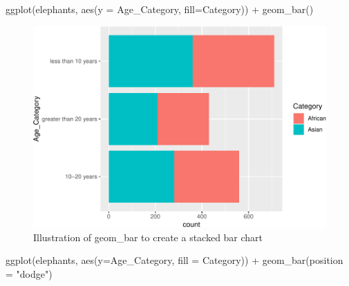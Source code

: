 \documentclass[
]{book}
\newenvironment{Shaded}{\begin{snugshade}}{\end{snugshade}}
\newcommand{\AttributeTok}[1]{\textcolor[rgb]{0.77,0.63,0.00}{#1}}
\newcommand{\FunctionTok}[1]{\textcolor[rgb]{0.00,0.00,0.00}{#1}}
\newcommand{\NormalTok}[1]{#1}
\newcommand{\SpecialCharTok}[1]{\textcolor[rgb]{0.00,0.00,0.00}{#1}}
\newcommand{\StringTok}[1]{\textcolor[rgb]{0.31,0.60,0.02}{#1}}
\begin{document}
\begin{Shaded}
\begin{Highlighting}[]
\FunctionTok{ggplot}\NormalTok{(elephants, }\FunctionTok{aes}\NormalTok{(}\AttributeTok{y =}\NormalTok{ Age\_Category, }\AttributeTok{fill=}\NormalTok{Category)) }\SpecialCharTok{+} 
  \FunctionTok{geom\_bar}\NormalTok{()}
\end{Highlighting}
\end{Shaded}

\begin{figure}
\centering
\includegraphics{Data-Visualisation-geom-Encyclopedia_files/figure-latex/unnamed-chunk-19-1.pdf}
\caption{\label{fig:unnamed-chunk-19}Illustration of geom\_bar to create a stacked bar chart}
\end{figure}

\begin{Shaded}
\begin{Highlighting}[]
\FunctionTok{ggplot}\NormalTok{(elephants, }\FunctionTok{aes}\NormalTok{(}\AttributeTok{y=}\NormalTok{Age\_Category, }\AttributeTok{fill =}\NormalTok{ Category)) }\SpecialCharTok{+}
  \FunctionTok{geom\_bar}\NormalTok{(}\AttributeTok{position =} \StringTok{"dodge"}\NormalTok{)}
\end{Highlighting}
\end{Shaded}
\end{document}
